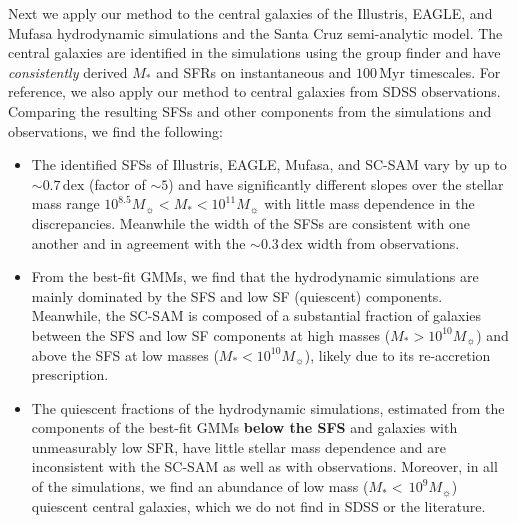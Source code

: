 \documentclass[tighten, preprint]{aastex62}
\begin{document}
Next we apply our method to the central galaxies of the Illustris, EAGLE, 
and {\sc Mufasa} hydrodynamic simulations and the Santa 
Cruz semi-analytic model. The central galaxies are identified in the  
simulations using the \cite{tinker2011} group 
finder and have \emph{consistently} derived $M_*$ and SFRs on instantaneous 
and $100\,\mathrm{Myr}$ timescales. For reference, we also apply our 
method to central galaxies from SDSS observations. Comparing the resulting 
SFSs and other components from the simulations and observations, we find the following:

\begin{itemize}
\item The identified SFSs of Illustris, EAGLE, {\sc Mufasa}, and SC-SAM 
vary by up to ${\sim}0.7\,\mathrm{dex}$ (factor of ${\sim}5$) 
and have significantly different slopes over the stellar mass
range $10^{8.5} M_\sun < M_* < 10^{11} M_\sun$ with little mass
dependence in the discrepancies. Meanwhile the width of the SFSs 
are consistent with one another and in agreement with the 
$\sim 0.3\,\mathrm{dex}$ width from observations.

\item From the best-fit GMMs, we find that the hydrodynamic simulations are 
mainly dominated by the SFS and low SF (quiescent) components. Meanwhile,
the SC-SAM is composed of a substantial fraction of galaxies between the 
SFS and low SF components at high masses ($M_* > 10^{10}M_\sun$) and above 
the SFS at low masses ($M_* < 10^{10}M_\sun$), likely due to its 
re-accretion prescription. 

\item The quiescent fractions of the hydrodynamic simulations, estimated 
from the components of the best-fit GMMs 
{\bf \color{red} below the SFS} 
and galaxies with unmeasurably 
low SFR, have little stellar mass dependence and are inconsistent 
with the SC-SAM as well as with observations. Moreover, in all of 
the simulations, we find an abundance of low mass ($M_*{<}\,10^9M_\sun$)
quiescent central galaxies, which we do not find in SDSS or the literature.
\end{itemize}
\end{document}

